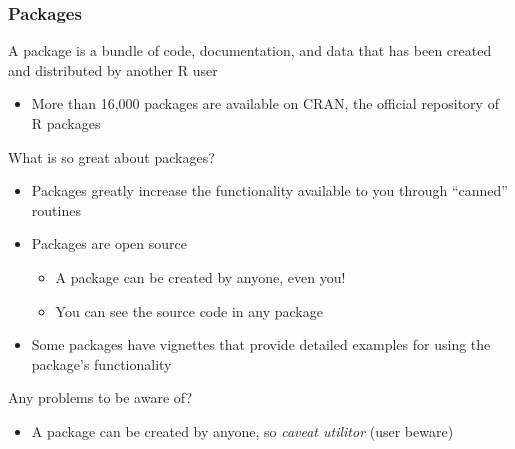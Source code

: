 \documentclass{beamer}\usepackage[]{graphicx}\usepackage[]{color}
\begin{document}
\begin{frame}\frametitle{Packages}
    A package is a bundle of code, documentation, and data that has been created and distributed by another R user
    \begin{itemize}
        \item More than 16,000 packages are available on CRAN, the official repository of R packages 
    \end{itemize}
    \vspace{2ex}
    What is so great about packages?
    \begin{itemize}
        \item Packages greatly increase the functionality available to you through ``canned'' routines
        \item Packages are open source
        \begin{itemize}
            \item A package can be created by anyone, even you!
            \item You can see the source code in any package
        \end{itemize}
        \item Some packages have vignettes that provide detailed examples for using the package's functionality
    \end{itemize}
    \vspace{2ex}
    Any problems to be aware of?
    \begin{itemize}
        \item A package can be created by anyone, so \emph{caveat utilitor} (user beware)
    \end{itemize}
\end{frame}
\end{document}
